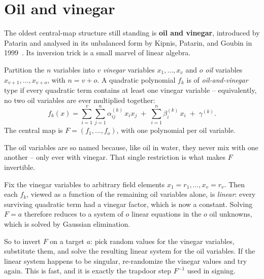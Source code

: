 \section{Oil and vinegar}

The oldest central-map structure still standing is \textbf{oil and vinegar}, introduced by Patarin and analysed in its unbalanced form by Kipnis, Patarin, and Goubin in 1999~\cite{kpg1999}. Its inversion trick is a small marvel of linear algebra.

\begin{definition}
Partition the $n$ variables into $v$ \emph{vinegar} variables $x_1,\dots,x_v$ and $o$ \emph{oil} variables $x_{v+1},\dots,x_{v+o}$, with $n = v + o$. A quadratic polynomial $f_k$ is of \emph{oil-and-vinegar} type if every quadratic term contains at least one vinegar variable -- equivalently, no two oil variables are ever multiplied together:
\[
f_k(x) = \sum_{i=1}^{v}\sum_{j=1}^{n} \alpha^{(k)}_{ij}\, x_i x_j
       \;+\; \sum_{i=1}^{n} \beta^{(k)}_i\, x_i \;+\; \gamma^{(k)} .
\]
The central map is $F = (f_1,\dots,f_o)$, with one polynomial per oil variable.
\end{definition}

The oil variables are so named because, like oil in water, they never mix with one another -- only ever with vinegar. That single restriction is what makes $F$ invertible.

\begin{proposition}
Fix the vinegar variables to arbitrary field elements $x_1 = r_1,\dots,x_v = r_v$. Then each $f_k$, viewed as a function of the remaining oil variables alone, is \emph{linear}: every surviving quadratic term had a vinegar factor, which is now a constant. Solving $F = a$ therefore reduces to a system of $o$ linear equations in the $o$ oil unknowns, which is solved by Gaussian elimination.
\end{proposition}

So to invert $F$ on a target $a$: pick random values for the vinegar variables, substitute them, and solve the resulting linear system for the oil variables. If the linear system happens to be singular, re-randomize the vinegar values and try again. This is fast, and it is exactly the trapdoor step $F^{-1}$ used in signing.

